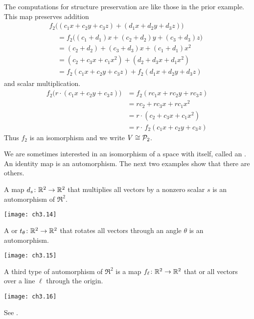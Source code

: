 \begin{example}
The computations for structure preservation are like those 
in the prior example.
This map preserves addition
\begin{multline*}
  f_2\bigl((c_1x+c_2y+c_3z)
        +(d_1x+d_2y+d_3z)\bigr)       \\
 \begin{aligned}
  &=f_2\bigl((c_1+d_1)x+(c_2+d_2)y+(c_3+d_3)z\bigr)   \\
  &=(c_2+d_2)+(c_3+d_3)x+(c_1+d_1)x^2   \\
  &=(c_2+c_3x+c_1x^2)+(d_2+d_3x+d_1x^2)   \\
  &=f_2(c_1x+c_2y+c_3z)+f_2(d_1x+d_2y+d_3z)
 \end{aligned}
\end{multline*}
and scalar multiplication.
\begin{align*}
  f_2\bigl(r\cdot(c_1x+c_2y+c_3z)\bigr)
  &=f_2(rc_1x+rc_2y+rc_3z)   \\
  &=rc_2+rc_3x+rc_1x^2   \\
  &=r\cdot(c_2+c_3x+c_1x^2)   \\
  &=r\cdot\, f_2(c_1x+c_2y+c_3z)
\end{align*}
Thus $f_2$ is an isomorphism and we write $V\cong\mathcal{P}_2$.
\end{example}

We are sometimes interested in an isomorphism of a space with itself,
called an %
.
An identity map is an automorphism.
The next two examples show that there are others.

\begin{example} \label{exam:RigidPlaneMapsAutos}
A 
map $\mbox{$d_s\colon \mathbb{R}^2\to \mathbb{R}^2$}$ that multiplies all vectors by a nonzero
scalar $s$ is an automorphism of $\Re^2$.
\begin{center} \small
  \texttt{[image: ch3.14]}                                
\end{center}
A %
or  $\mbox{$t_{\theta}\colon \mathbb{R}^2\to \mathbb{R}^2$}$
that rotates all vectors through an angle $\theta$ is an automorphism.
\begin{center} \small
  \texttt{[image: ch3.15]}                                
\end{center}
A third type of automorphism of $\Re^2$ is a map 
$\mbox{$f_\ell\colon \mathbb{R}^2\to \mathbb{R}^2$}$ that 
or %
all vectors over a line $\ell$ through the origin.
\begin{center} \small
  \texttt{[image: ch3.16]}                                
\end{center}
See .
\end{example}

